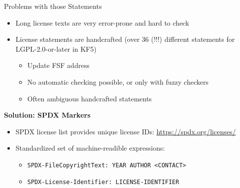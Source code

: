 \documentclass[t,compress,aspectratio=169]{beamer}
\begin{document}
\begin{frame}
    {Problems with those Statements}

    \begin{itemize}
        \item Long license texts are very error-prone and hard to check
        \item License statements are handcrafted (over 36 (!!!) different statements for LGPL-2.0-or-later in KF5)
            \begin{itemize}
                \item Update FSF address
                \item No automatic checking possible, or only with fuzzy checkers
                \item Often ambiguous handcrafted statements
            \end{itemize}
    \end{itemize}

    \textbf{Solution: SPDX Markers}
    \begin{itemize}
        \item SPDX license list provides unique license IDs: \url{https://spdx.org/licenses/}
        \item Standardized set of machine-readible expressions:
            \begin{itemize}
                \item \texttt{SPDX-FileCopyrightText: YEAR AUTHOR <CONTACT>}
                \item \texttt{SPDX-License-Identifier: LICENSE-IDENTIFIER}
            \end{itemize}
    \end{itemize}
\end{frame}
\end{document}
